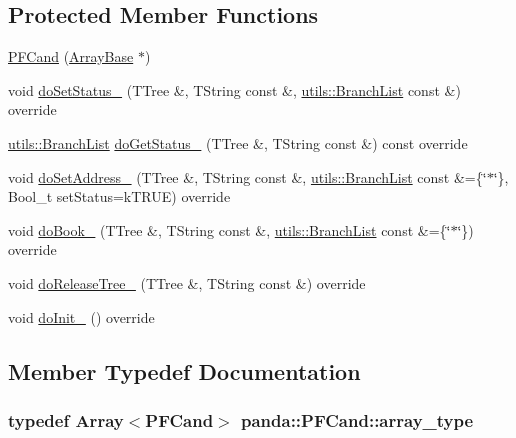 \subsection*{Protected Member Functions}
\begin{DoxyCompactItemize}
\item 
\hyperlink{classpanda_1_1PFCand_a4dd4be41d1ae3bceea589c14d074a062}{PFCand} (\hyperlink{classpanda_1_1ArrayBase}{ArrayBase} $\ast$)
\item 
void \hyperlink{classpanda_1_1PFCand_a263dcf1e5a9b704827d4b4af006ebcf4}{doSetStatus\_\-} (TTree \&, TString const \&, \hyperlink{classpanda_1_1utils_1_1BranchList}{utils::BranchList} const \&) override
\item 
\hyperlink{classpanda_1_1utils_1_1BranchList}{utils::BranchList} \hyperlink{classpanda_1_1PFCand_a3567f5259663a227698b6e27cc340cb4}{doGetStatus\_\-} (TTree \&, TString const \&) const override
\item 
void \hyperlink{classpanda_1_1PFCand_a2b6d101e2b1391e4c942b1f5ec2f6151}{doSetAddress\_\-} (TTree \&, TString const \&, \hyperlink{classpanda_1_1utils_1_1BranchList}{utils::BranchList} const \&=\{\char`\"{}$\ast$\char`\"{}\}, Bool\_\-t setStatus=kTRUE) override
\item 
void \hyperlink{classpanda_1_1PFCand_a0e032b321a5b1003d7639b72a211c7be}{doBook\_\-} (TTree \&, TString const \&, \hyperlink{classpanda_1_1utils_1_1BranchList}{utils::BranchList} const \&=\{\char`\"{}$\ast$\char`\"{}\}) override
\item 
void \hyperlink{classpanda_1_1PFCand_adefaef174f963c22f95e9ff84b3b4922}{doReleaseTree\_\-} (TTree \&, TString const \&) override
\item 
void \hyperlink{classpanda_1_1PFCand_afef3eb199afc086c2952e479fa1f191b}{doInit\_\-} () override
\end{DoxyCompactItemize}


\subsection{Member Typedef Documentation}
\hypertarget{classpanda_1_1PFCand_aea303dd18044eafc5ea0953e22f2f095}{
\subsubsection[{array\_\-type}]{\setlength{\rightskip}{0pt plus 5cm}typedef {\bf Array}$<${\bf PFCand}$>$ {\bf panda::PFCand::array\_\-type}}}
\label{classpanda_1_1PFCand_aea303dd18044eafc5ea0953e22f2f095}


